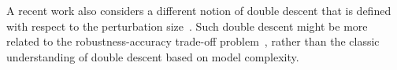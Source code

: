 

 

A recent work also considers a different notion of double descent that is defined with respect to the perturbation size~\citep{Yu2021UnderstandingGI}. 
Such double descent might be more related to the robustness-accuracy trade-off problem~\citep{Papernot2016TowardsTS, Su2018IsRT, Tsipras2019RobustnessMB, Zhang2019TheoreticallyPT}, rather than the classic understanding of double descent based on model complexity.








